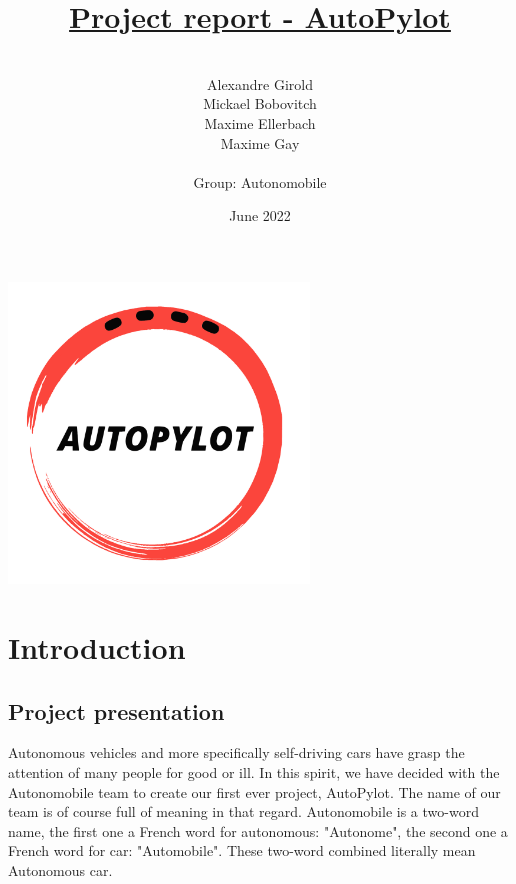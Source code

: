 \documentclass[12pt]{article}
\begin{document}
\title{\underline{Project report - AutoPylot}}
\date{June 2022}


\author{%
    \\
    Alexandre Girold\\
    Mickael Bobovitch \\
    Maxime Ellerbach \\
    Maxime Gay \\ \\
    Group: Autonomobile 
    }

\maketitle

\centerline{\includegraphics[height=8cm]{../../logos/logo-transparent-black.png}}
\newpage

\tableofcontents
\newpage

\section{Introduction}

\subsection{Project presentation}
Autonomous vehicles and more specifically self-driving cars have grasp the attention of many people for good or ill. In this spirit, we have decided with the Autonomobile team to create our first ever project, AutoPylot. The name of our team is of course full of meaning in that regard. Autonomobile is a two-word name, the first one a French word for autonomous: "Autonome", the second one a French word for car: "Automobile". These two-word combined literally mean Autonomous car.\\
\end{document}
